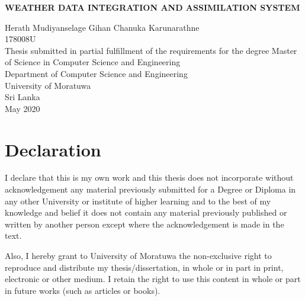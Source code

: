 \documentclass[a4paper,oneside,12pt]{report}
\begin{document}
\begin{titlepage}
    \begin{center}
        \Large{
        \textbf{WEATHER DATA INTEGRATION AND ASSIMILATION SYSTEM}}\\
        \vspace{144pt}
  \large      

        Herath Mudiyanselage Gihan Chanuka Karunarathne\\
        \vspace{24pt}
        178008U\\
         \vspace{72pt}
        \normalsize
        Thesis submitted in partial fulfillment of the requirements for the degree Master of Science in Computer Science and Engineering\\
     
       \vspace{72pt}
        \large
        Department of Computer Science and Engineering\\
        \vspace{24pt}
        University of Moratuwa\\
        Sri Lanka\\
        \vspace{32pt}
        May 2020
        
    \end{center}
\end{titlepage}


\chapter*{Declaration}

I declare that this is my own work and this thesis does not
incorporate without acknowledgement any material previously submitted for a
Degree or Diploma in any other University or institute of higher learning and to
the best of my knowledge and belief it does not contain any material previously
published or written by another person except where the acknowledgement is
made in the text.

Also, I hereby grant to University of Moratuwa the non-exclusive right to
reproduce and distribute my thesis/dissertation, in whole or in part in print,
electronic or other medium. I retain the right to use this content in whole or part
in future works (such as articles or books).
\end{document}
